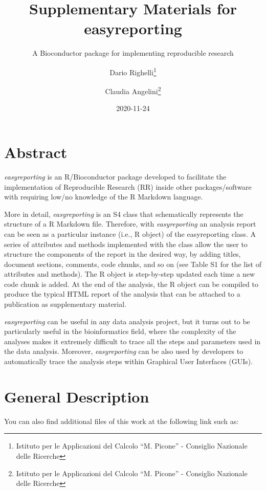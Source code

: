 \documentclass[]{article}
\title{Supplementary Materials for easyreporting}
\subtitle{A Bioconductor package for implementing reproducible research}
\author{Dario Righelli\footnote{Istituto per le Applicazioni del Calcolo ``M.
  Picone'' - Consiglio Nazionale delle Ricerche} \and Claudia Angelini\footnote{Istituto per le Applicazioni del Calcolo ``M.
  Picone'' - Consiglio Nazionale delle Ricerche}}
\date{2020-11-24}
\begin{document}
\maketitle

\newcommand{\beginsupplement}{%
        \setcounter{table}{0}
        \renewcommand{\thetable}{S\arabic{table}}%
        \setcounter{figure}{0}
        \renewcommand{\thefigure}{S\arabic{figure}}%
     }

\hypertarget{abstract}{%
\section{Abstract}\label{abstract}}

\emph{easyreporting} is an R/Bioconductor package developed to
facilitate the implementation of Reproducible Research (RR) inside other
packages/software with requiring low/no knowledge of the R Markdown
language.

More in detail, \emph{easyreporting} is an S4 class that schematically
represents the structure of a R Markdown file. Therefore, with
\emph{easyreporting} an analysis report can be seen as a particular
instance (i.e., R object) of the easyreporting class. A series of
attributes and methods implemented with the class allow the user to
structure the components of the report in the desired way, by adding
titles, document sections, comments, code chunks, and so on (see Table
S1 for the list of attributes and methods). The R object is step-by-step
updated each time a new code chunk is added. At the end of the analysis,
the R object can be compiled to produce the typical HTML report of the
analysis that can be attached to a publication as supplementary
material.

\emph{easyreporting} can be useful in any data analysis project, but it
turns out to be particularly useful in the bioinformatics field, where
the complexity of the analyses makes it extremely difficult to trace all
the steps and parameters used in the data analysis. Moreover,
\emph{easyreporting} can be also used by developers to automatically
trace the analysis steps within Graphical User Interfaces (GUIs).

\hypertarget{general-description}{%
\section{General Description}\label{general-description}}

You can also find additional files of this work at the following link
such as:
\end{document}
